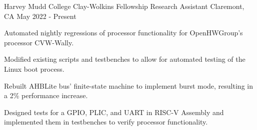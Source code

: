   \begin{cventry}
    {Harvey Mudd College} %
    {Clay-Wolkins Fellowship Research Assistant} %
    {Claremont, CA} %
    {May 2022 - Present} %
    {
    \begin{cvitems}
      \item {
      Automated nightly regressions of processor functionality for OpenHWGroup's processor CVW-Wally.
      }
      \item{
      Modified existing scripts and testbenches to allow for automated testing of the Linux boot process.
      }
      \item{
      Rebuilt AHBLite bus' finite-state machine to implement burst mode, resulting in a 2\% performance increase.
      }
      \item{
      Designed tests for a GPIO, PLIC, and UART in RISC-V Assembly and implemented them in testbenches to verify processor functionality.
      }
    \end{cvitems}
    }
  \end{cventry}
